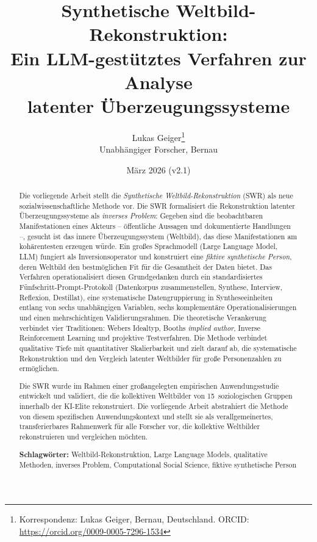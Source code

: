 \documentclass[11pt,a4paper]{article}
\title{%
  \sffamily\bfseries
  Synthetische Weltbild-Rekonstruktion:\\[0.3em]
  \large Ein LLM-gest\"utztes Verfahren zur Analyse\\
  latenter \"Uberzeugungssysteme%
}
\author{%
  Lukas Geiger\thanks{Korrespondenz: Lukas Geiger, Bernau, Deutschland. ORCID: \url{https://orcid.org/0009-0005-7296-1534}}\\[0.3em]
  \small Unabh\"angiger Forscher, Bernau
}
\date{M\"arz 2026 (v2.1)}
\theoremstyle{definition}
\theoremstyle{plain}
\theoremstyle{remark}
\begin{document}

\maketitle
\thispagestyle{empty}

\begin{abstract}
\noindent
Die vorliegende Arbeit stellt die \emph{Synthetische Weltbild-Rekonstruktion} (SWR) als neue sozialwissenschaftliche Methode vor. Die SWR formalisiert die Rekonstruktion latenter \"Uberzeugungssysteme als \emph{inverses Problem}: Gegeben sind die beobachtbaren Manifestationen eines Akteurs -- \"offentliche Aussagen und dokumentierte Handlungen --, gesucht ist das innere \"Uberzeugungssystem (Weltbild), das diese Manifestationen am koh\"arentesten erzeugen w\"urde. Ein gro\ss{}es Sprachmodell (Large Language Model, LLM) fungiert als Inversionsoperator und konstruiert eine \emph{fiktive synthetische Person}, deren Weltbild den bestm\"oglichen Fit f\"ur die Gesamtheit der Daten bietet. Das Verfahren operationalisiert diesen Grundgedanken durch ein standardisiertes F\"unfschritt-Prompt-Protokoll (Datenkorpus zusammenstellen, Synthese, Interview, Reflexion, Destillat), eine systematische Datengruppierung in Syntheseeinheiten entlang von sechs unabh\"angigen Variablen, sechs komplement\"are Operationalisierungen und einen mehrschichtigen Validierungsrahmen. Die theoretische Verankerung verbindet vier Traditionen: Webers Idealtyp, Booths \emph{implied author}, Inverse Reinforcement Learning und projektive Testverfahren. Die Methode verbindet qualitative Tiefe mit quantitativer Skalierbarkeit und zielt darauf ab, die systematische Rekonstruktion und den Vergleich latenter Weltbilder f\"ur gro\ss{}e Personenzahlen zu erm\"oglichen.

Die SWR wurde im Rahmen einer gro\ss{}angelegten empirischen Anwendungsstudie \citep{Geiger2026Elite} entwickelt und validiert, die die kollektiven Weltbilder von 15~soziologischen Gruppen innerhalb der KI-Elite rekonstruiert. Die vorliegende Arbeit abstrahiert die Methode von diesem spezifischen Anwendungskontext und stellt sie als verallgemeinertes, transferierbares Rahmenwerk f\"ur alle Forscher vor, die kollektive Weltbilder rekonstruieren und vergleichen m\"ochten.

\medskip
\noindent\textbf{Schlagw\"orter:} Weltbild-Rekonstruktion, Large Language Models, qualitative Methoden, inverses Problem, Computational Social Science, fiktive synthetische Person
\end{abstract}
\end{document}
